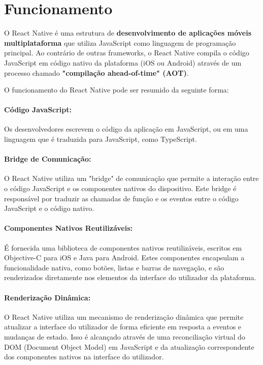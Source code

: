 \documentclass[runningheads]{llncs}
\begin{document}
\vspace{10mm}


\section{Funcionamento}
O React Native é uma estrutura de \textbf{desenvolvimento de aplicações móveis multiplataforma} que utiliza JavaScript como linguagem de programação principal. Ao contrário de outras frameworks, o React Native compila o código JavaScript em código nativo da plataforma (iOS ou Android) através de um processo chamado \textbf{"compilação ahead-of-time" (AOT)}.

\vspace{3mm}

O funcionamento do React Native pode ser resumido da seguinte forma:


\paragraph{\textbf{Código JavaScript:}} Os desenvolvedores escrevem o código da aplicação em JavaScript, ou em uma linguagem que é traduzida para JavaScript, como TypeScript.
\paragraph{\textbf{Bridge de Comunicação:}} O React Native utiliza um "bridge" de comunicação que permite a interação entre o código JavaScript e os componentes nativos do dispositivo. Este bridge é responsável por traduzir as chamadas de função e os eventos entre o código JavaScript e o código nativo.
\paragraph{\textbf{Componentes Nativos Reutilizáveis:}} É fornecida uma biblioteca de componentes nativos reutilizáveis, escritos em Objective-C para iOS e Java para Android. Estes componentes encapsulam a funcionalidade nativa, como botões, listas e barras de navegação, e são renderizados diretamente nos elementos da interface do utilizador da plataforma.
\paragraph{\textbf{Renderização Dinâmica:}} O React Native utiliza um mecanismo de renderização dinâmica que permite atualizar a interface do utilizador de forma eficiente em resposta a eventos e mudanças de estado. Isso é alcançado através de uma reconciliação virtual do DOM (Document Object Model) em JavaScript e da atualização correspondente dos componentes nativos na interface do utilizador.
\end{document}
